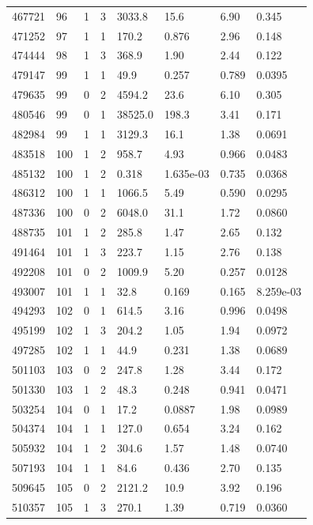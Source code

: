 \documentclass[preview]{standalone}
\begin{document}
{{{{{{{{\begin{tabular}{L{1.2cm}C{1.2cm} C{0.3cm}C{0.5cm} C{1.4cm}C{1.4cm} C{1.4cm}C{1.4cm}}
  467721  &    96  & 1     &  3 &  3033.8  & 15.6  & 6.90 &  0.345   \\ 
  471252  &    97  & 1     &  1 &  170.2  & 0.876  & 2.96 &  0.148   \\ 
  474444  &    98  & 1     &  3 &  368.9  & 1.90  & 2.44 &  0.122   \\ 
  479147  &    99  & 1     &  1 &  49.9  & 0.257  & 0.789 &  0.0395   \\ 
  479635  &    99  & 0     &  2 &  4594.2  & 23.6  & 6.10 &  0.305   \\ 
  480546  &    99  & 0     &  1 &  38525.0  & 198.3  & 3.41 &  0.171   \\ 
  482984  &    99  & 1     &  1 &  3129.3  & 16.1  & 1.38 &  0.0691   \\ 
  483518  &   100  & 1     &  2 &  958.7  & 4.93  & 0.966 &  0.0483   \\ 
  485132  &   100  & 1     &  2 &  0.318  & 1.635e-03  & 0.735 &  0.0368   \\ 
  486312  &   100  & 1     &  1 &  1066.5  & 5.49  & 0.590 &  0.0295   \\ 
  487336  &   100  & 0     &  2 &  6048.0  & 31.1  & 1.72 &  0.0860   \\ 
  488735  &   101  & 1     &  2 &  285.8  & 1.47  & 2.65 &  0.132   \\ 
  491464  &   101  & 1     &  3 &  223.7  & 1.15  & 2.76 &  0.138   \\ 
  492208  &   101  & 0     &  2 &  1009.9  & 5.20  & 0.257 &  0.0128   \\ 
  493007  &   101  & 1     &  1 &  32.8  & 0.169  & 0.165 &  8.259e-03   \\ 
  494293  &   102  & 0     &  1 &  614.5  & 3.16  & 0.996 &  0.0498   \\ 
  495199  &   102  & 1     &  3 &  204.2  & 1.05  & 1.94 &  0.0972   \\ 
  497285  &   102  & 1     &  1 &  44.9  & 0.231  & 1.38 &  0.0689   \\ 
  501103  &   103  & 0     &  2 &  247.8  & 1.28  & 3.44 &  0.172   \\ 
  501330  &   103  & 1     &  2 &  48.3  & 0.248  & 0.941 &  0.0471   \\ 
  503254  &   104  & 0     &  1 &  17.2  & 0.0887  & 1.98 &  0.0989   \\ 
  504374  &   104  & 1     &  1 &  127.0  & 0.654  & 3.24 &  0.162   \\ 
  505932  &   104  & 1     &  2 &  304.6  & 1.57  & 1.48 &  0.0740   \\ 
  507193  &   104  & 1     &  1 &  84.6  & 0.436  & 2.70 &  0.135   \\ 
  509645  &   105  & 0     &  2 &  2121.2  & 10.9  & 3.92 &  0.196   \\ 
  510357  &   105  & 1     &  3 &  270.1  & 1.39  & 0.719 &  0.0360   \\ 
\hline 
\end{tabular} 

}}}}}}}}
\end{document}
